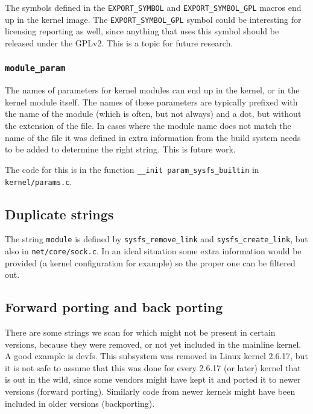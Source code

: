 \documentclass[10pt]{article}
\begin{document}
The symbols defined in the \texttt{EXPORT\_SYMBOL} and
\texttt{EXPORT\_SYMBOL\_GPL} macros end up in the kernel image. The
\texttt{EXPORT\_SYMBOL\_GPL} symbol could be interesting for licensing
reporting as well, since anything that uses this symbol should be released
under the GPLv2. This is a topic for future research.

\subsubsection{\texttt{module\_param}}

The names of parameters for kernel modules can end up in the kernel, or in the
kernel module itself. The names of these parameters are typically prefixed
with the name of the module (which is often, but not always) and a dot, but
without the extension of the file. In cases where the module name does not
match the name of the file it was defined in extra information from the
build system needs to be added to determine the right string. This is future
work.

The code for this is in the function \texttt{\_\_init param\_sysfs\_builtin} in
\texttt{kernel/params.c}.

\subsection{Duplicate strings}

The string \texttt{module} is defined by \texttt{sysfs\_remove\_link} and
\texttt{sysfs\_create\_link}, but also in \texttt{net/core/sock.c}.
In an ideal situation some extra information would be provided (a kernel configuration for example) so the proper one can be filtered out.

\subsection{Forward porting and back porting}

There are some strings we scan for which might not be present in certain
versions, because they were removed, or not yet included in the mainline
kernel. A good example is devfs. This subsystem was removed in Linux kernel
2.6.17, but it is not safe to assume that this was done for every 2.6.17 (or
later) kernel that is out in the wild, since some vendors might have kept it
and ported it to newer versions (forward porting). Similarly code from newer
kernels might have been included in older versions
(backporting).
\end{document}
